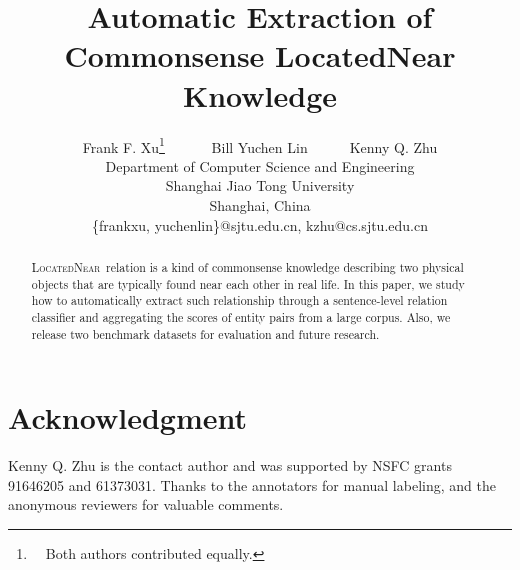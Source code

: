 \documentclass[11pt,a4paper]{article}
\newcommand{\lnear}{\textsc{LocatedNear}}
\begin{document}
	
	\title{Automatic Extraction of Commonsense LocatedNear Knowledge}
	\author{Frank F. Xu\thanks{~~Both authors contributed equally.} ~~~~~~Bill Yuchen Lin\footnotemark[1]~~~~~~Kenny Q. Zhu\\
		Department of Computer Science and Engineering\\
		Shanghai Jiao Tong University \\ Shanghai, China\\ \{frankxu, yuchenlin\}@sjtu.edu.cn, kzhu@cs.sjtu.edu.cn}
	\maketitle
\begin{abstract}
	\lnear~relation is a kind of commonsense knowledge
	describing two physical objects that are typically found near each
	other in real life. 
	In this paper, we study how to automatically extract such relationship through
	a sentence-level relation classifier and aggregating the scores of entity pairs from a large corpus.
	Also, we release two benchmark datasets for evaluation and future research.
\end{abstract}








%



\section*{Acknowledgment}
Kenny Q. Zhu is the contact author and was supported by NSFC grants 91646205 and 61373031. Thanks to the annotators for manual labeling, and the anonymous reviewers for valuable comments.



\end{document}
